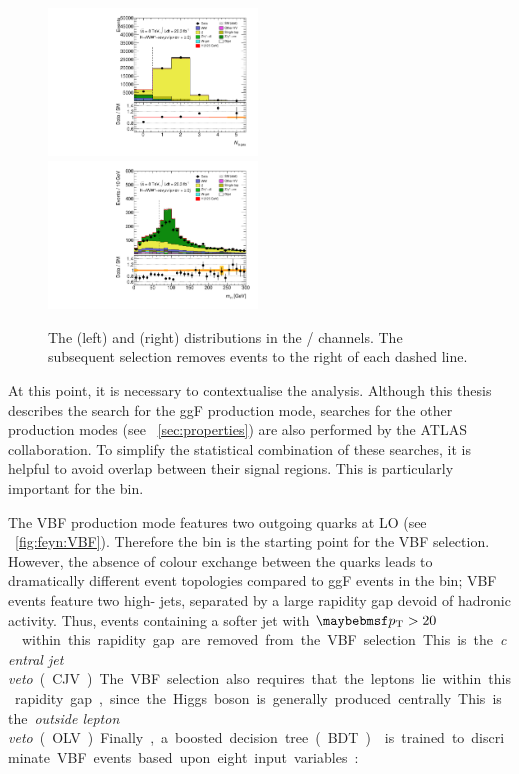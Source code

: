 \begin{figure}[t]
	\includegraphics[width=0.495\textwidth]{tex/selection/emme_CutFailVBF_2jetincl_nJets_Pt20_MV1_85_mh125_lin}
	\hfill
	\includegraphics[width=0.495\textwidth]{tex/selection/emme_CutFailVBFbVeto_2jetincl_Mtt_TrackHWW_Clj_mh125_lin}
	\caption{The \nbjets (left) and \mtautau (right) distributions in the \emch/\mech 
	channels. The subsequent selection removes events to the right of each dashed line.}
	\label{fig:sel:2j:df_cuts}
\end{figure}

At this point, it is necessary to contextualise the analysis. Although this thesis 
describes the search for the ggF production mode, searches for the other production modes 
(see \Section~\ref{sec:properties}) are also performed by the ATLAS collaboration. To 
simplify the statistical combination of these searches, it is helpful to avoid overlap 
between their signal regions. This is particularly important for the \twojet bin.

The VBF production mode features two outgoing quarks at LO (see \Figure~\ref{fig:feyn:VBF}). 
Therefore the \twojet bin is the starting point for the VBF selection. However, the 
absence of colour exchange between the quarks leads to dramatically different event 
topologies compared to ggF events in the \twojet bin; VBF events feature two high-\pt 
jets, separated by a large rapidity gap devoid of hadronic activity. Thus, events 
containing a softer jet with \unit{$\pt > 20$}{\GeV} within this rapidity gap are removed 
from the VBF selection. This is the \textit{central jet veto} (CJV). The VBF selection 
also requires that the leptons lie within this rapidity gap, since the Higgs boson is 
generally produced centrally. This is the \textit{outside lepton veto} (OLV). Finally, a 
boosted decision tree (BDT) \cite{TMVA} is trained to discriminate VBF events based upon 
eight input variables:

